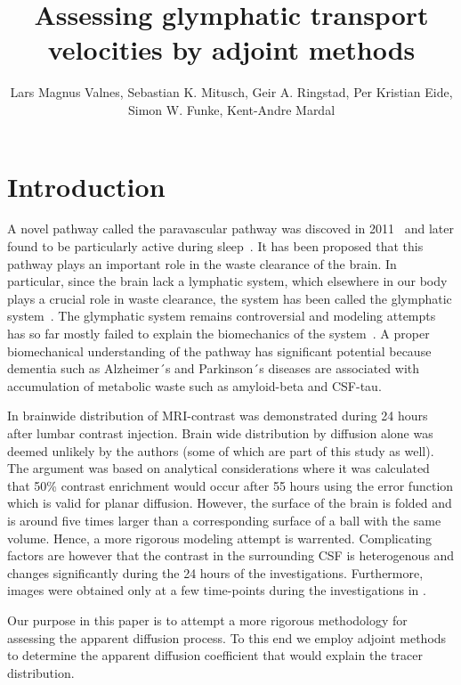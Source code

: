 \documentclass[11pt,a4paper]{article}
\title{Assessing glymphatic transport velocities by adjoint methods}
\author{Lars Magnus Valnes, Sebastian K. Mitusch, Geir A. Ringstad, Per Kristian Eide, Simon W. Funke, Kent-Andre Mardal }
\begin{document}
\maketitle

\begin{abstract}
\end{abstract}
\section{Introduction}

A novel pathway called the paravascular pathway was discoved in 2011~\cite{iliff2012paravascular} and later found to be particularly active during sleep~\cite{xie2013sleep}. 
It has been proposed that this pathway plays an important role in the waste
clearance of the brain. In particular, since the brain lack a lymphatic system, 
which elsewhere in our body plays a crucial role in waste clearance, the system has been called the glymphatic system~\cite{jessen2015glymphatic}.  
The glymphatic system remains controversial and modeling attempts
has so far mostly failed to explain the biomechanics of the system~\cite{holter2017interstitial, smith2017glymphatic}. A proper biomechanical 
understanding of the pathway has significant potential because
dementia such as Alzheimer´s and Parkinson´s diseases are
associated with accumulation of metabolic waste such as
amyloid-beta and CSF-tau.  

In \cite{ringstad2018brain} brainwide distribution of MRI-contrast was demonstrated during 24 hours after lumbar contrast injection. Brain wide distribution by diffusion alone was deemed unlikely by the authors (some of which are part 
of this study as well). The argument was based on analytical considerations where it was calculated that 50\% contrast enrichment would occur after 
55 hours using the error function which is valid for planar diffusion. However, 
the surface of the brain is folded and is around five times larger than 
a corresponding surface of a ball with the same volume. Hence, 
a more rigorous modeling attempt is warrented. Complicating factors
are however that the contrast in the surrounding CSF is heterogenous
and changes significantly during the 24 hours of the investigations. 
Furthermore, images were obtained only at a few time-points during the investigations in \cite{ringstad2018brain}.  

Our purpose in this paper is to attempt a more rigorous methodology 
for assessing the apparent diffusion process. To this end we employ
adjoint methods to determine the apparent diffusion coefficient 
that would explain the tracer distribution.  
  
\end{document}
